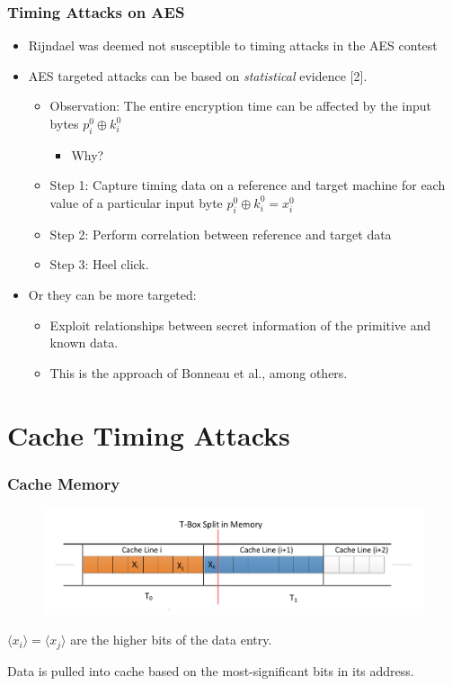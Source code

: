 \documentclass[9pt,handout]{beamer}
\begin{document}
\begin{frame}
	\frametitle{Timing Attacks on AES}
	\begin{itemize}
		\item Rijndael was deemed not susceptible to timing attacks in the AES contest
		\item AES targeted attacks can be based on \emph{statistical} evidence [2].
		\begin{itemize}
			\item Observation: The entire encryption time can be affected by the input bytes $p_i^0 \oplus k_i^0$
			\begin{itemize}
				\item Why? %
			\end{itemize}
			\item Step 1: Capture timing data on a reference and target machine for each value of a particular input byte $p_i^0 \oplus k_i^0 = x_i^0$
			\item Step 2: Perform correlation between reference and target data
			\item Step 3: Heel click.
		\end{itemize}
		\item Or they can be more targeted:
		\begin{itemize}
			\item Exploit relationships between secret information of the primitive and known data.
			\item This is the approach of Bonneau et al., among others.
		\end{itemize}
	\end{itemize}
\end{frame}

\section{Cache Timing Attacks}
\begin{frame}
	\frametitle{Cache Memory}
\begin{figure}
\centering
\includegraphics[scale = 0.35]{images/aesCacheLines.pdf}
\end{figure}
$\langle x_i \rangle = \langle x_j \rangle$ are the higher bits of the data entry.

\medskip

Data is pulled into cache based on the most-significant bits in its address.
\end{frame}
\end{document}
